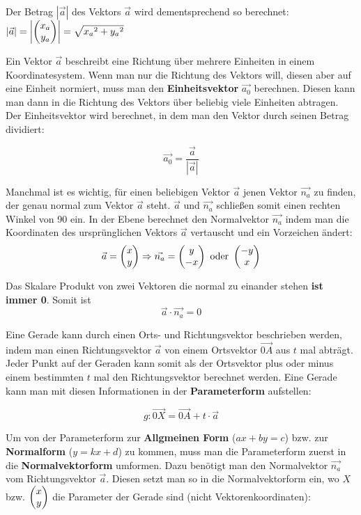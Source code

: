Der Betrag $|\vec{a}|$ des Vektors $\vec{a}$ wird dementsprechend so berechnet: $ |\vec{a}| = \left|\begin{pmatrix}x_a \\ y_a\end{pmatrix}\right| = \sqrt{{x_{a}}^2 + {y_{a}}^2}$


Ein Vektor $\vec{a}$ beschreibt eine Richtung \"{u}ber mehrere Einheiten in einem Koordinatesystem. Wenn man nur die Richtung des Vektors will, diesen aber auf eine Einheit normiert, muss man den \textbf{Einheitsvektor} $\vec{a_{0}}$ berechnen. Diesen kann man dann in die Richtung des Vektors \"{u}ber beliebig viele Einheiten abtragen. Der Einheitsvektor wird berechnet, in dem man den Vektor durch seinen Betrag dividiert:

$$\vec{a_{0}} = \frac{\vec{a}}{|\vec{a}|}$$


Manchmal ist es wichtig, f\"{u}r einen beliebigen Vektor $\vec{a}$ jenen Vektor $\vec{n_{a}}$ zu finden, der genau normal zum Vektor $\vec{a}$ steht. $\vec{a}$ und $\vec{n_{a}}$ schlie\ss{}en somit einen rechten Winkel von 90\degree{} ein. In der Ebene berechnet den Normalvektor $\vec{n_{a}}$ indem man die Koordinaten des urspr\"{u}nglichen Vektors $\vec{a}$ vertauscht und ein Vorzeichen \"{a}ndert:
$$ \vec{a} = \begin{pmatrix}x\\y\end{pmatrix} \Rightarrow \vec{n_{a}} = \begin{pmatrix}y \\ -x\end{pmatrix} \text{ oder } \begin{pmatrix}-y \\ x\end{pmatrix}$$

Das Skalare Produkt von zwei Vektoren die normal zu einander stehen \textbf{ist immer 0}. Somit ist $$\vec{a} \cdot \vec{n_{a}} = 0$$

\pagebreak



Eine Gerade kann durch einen Orts- und Richtungsvektor beschrieben werden, indem man einen Richtungsvektor $\vec{a}$ von einem Ortsvektor $\vec{0A}$ aus $t$ mal abtr\"{a}gt. Jeder Punkt auf der Geraden kann somit als der Ortsvektor plus oder minus einem bestimmten $t$ mal den Richtungsvektor berechnet werden. Eine Gerade kann man mit diesen Informationen in der \textbf{Parameterform} aufstellen:

$$g: \vec{0X} = \vec{0A} + t \cdot \vec{a}$$


Um von der Parameterform zur \textbf{Allgmeinen Form} ($ax + by = c$) bzw. zur \textbf{Normalform} ($y = kx + d$) zu kommen, muss man die Parameterform zuerst in die \textbf{Normalvektorform} umformen. Dazu ben\"{o}tigt man den Normalvektor $\vec{n_{a}}$ vom Richtungsvektor $\vec{a}$. Diesen setzt man so in die Normalvektorform ein, wo $X$ bzw. $\begin{pmatrix}x\\y\end{pmatrix}$ die Parameter der Gerade sind (nicht Vektorenkoordinaten):

